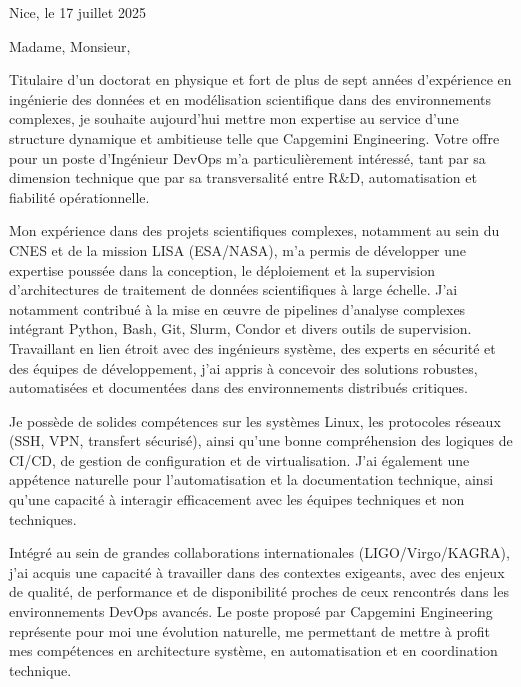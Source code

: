 \documentclass[10pt,a4paper]{altacv}
\begin{document}
\makecvheader





{\color{body}
\iffalse
Nice, le 17 juillet 2025

Madame, Monsieur,

Titulaire d'un doctorat en physique et fort de plus de sept années d'expérience en ingénierie des données et en modélisation scientifique dans des environnements complexes, je souhaite aujourd'hui mettre mon expertise au service d'une structure dynamique et ambitieuse telle que Capgemini Engineering. Votre offre pour un poste d'Ingénieur DevOps m'a particulièrement intéressé, tant par sa dimension technique que par sa transversalité entre R\&D, automatisation et fiabilité opérationnelle.

Mon expérience dans des projets scientifiques complexes, notamment au sein du CNES et de la mission LISA (ESA/NASA), m'a permis de développer une expertise poussée dans la conception, le déploiement et la supervision d'architectures de traitement de données scientifiques à large échelle. J'ai notamment contribué à la mise en œuvre de pipelines d'analyse complexes intégrant Python, Bash, Git, Slurm, Condor et divers outils de supervision. Travaillant en lien étroit avec des ingénieurs système, des experts en sécurité et des équipes de développement, j'ai appris à concevoir des solutions robustes, automatisées et documentées dans des environnements distribués critiques.

Je possède de solides compétences sur les systèmes Linux, les protocoles réseaux (SSH, VPN, transfert sécurisé), ainsi qu'une bonne compréhension des logiques de CI/CD, de gestion de configuration et de virtualisation. J'ai également une appétence naturelle pour l'automatisation et la documentation technique, ainsi qu'une capacité à interagir efficacement avec les équipes techniques et non techniques.

Intégré au sein de grandes collaborations internationales (LIGO/Virgo/KAGRA), j'ai acquis une capacité à travailler dans des contextes exigeants, avec des enjeux de qualité, de performance et de disponibilité proches de ceux rencontrés dans les environnements DevOps avancés. Le poste proposé par Capgemini Engineering représente pour moi une évolution naturelle, me permettant de mettre à profit mes compétences en architecture système, en automatisation et en coordination technique.

}
\end{document}
